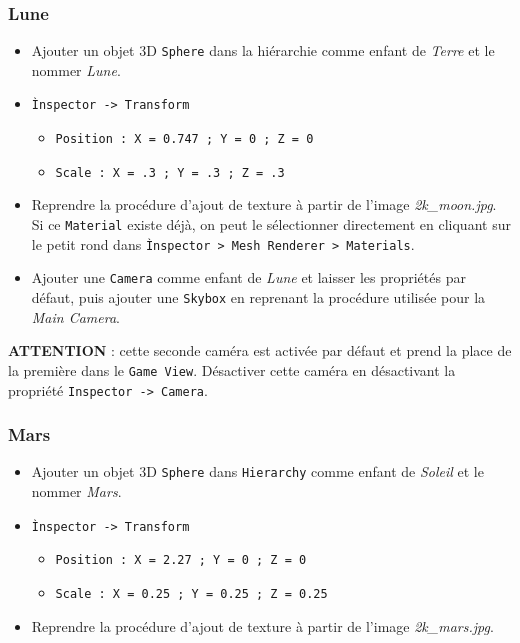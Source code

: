 \documentclass[a4paper,10pt]{article}
\newenvironment{solution}%
{\begin{tcolorbox}[breakable,colback=red!5!white,colframe=red!75!black,title=Solution]}%
{\end{tcolorbox}}
\begin{document}
\begin{solution}
\subsubsection{Lune}
\begin{itemize}
	\item Ajouter un objet 3D \texttt{Sphere} dans la hiérarchie comme enfant de \textit{Terre} et le nommer \textit{Lune}.
	\item \texttt{Ìnspector -> Transform}
	\begin{itemize}
		\item \texttt{Position : X = 0.747 ; Y = 0 ; Z = 0  }
		\item  \texttt{Scale : X = .3 ; Y = .3 ; Z = .3}
	\end{itemize}
	\item Reprendre la procédure d'ajout de texture à partir de l'image \textit{2k\_moon.jpg}. Si ce \texttt{Material} existe déjà, on peut le sélectionner directement en cliquant sur le petit rond dans \texttt{Ìnspector > Mesh Renderer > Materials}.
	\item Ajouter une \texttt{Camera} comme enfant de \textit{Lune} et laisser les propriétés par défaut, puis ajouter une \texttt{Skybox} en reprenant la procédure utilisée pour la \textit{Main Camera}.
\end{itemize}
	\textbf{ATTENTION} : cette seconde caméra est activée par défaut et prend la place de la première dans le \texttt{Game View}. Désactiver cette caméra en désactivant la propriété \texttt{Inspector -> Camera}.

\subsubsection{Mars}
\begin{itemize}
	\item  Ajouter un objet 3D \texttt{Sphere} dans \texttt{Hierarchy} comme enfant de \textit{Soleil} et le nommer \textit{Mars}.
	\item \texttt{Ìnspector -> Transform}
	\begin{itemize}
		\item \texttt{Position : X = 2.27 ; Y = 0 ; Z = 0 }
		\item \texttt{Scale : X = 0.25 ; Y = 0.25 ; Z = 0.25} 
	\end{itemize}
	
	\item Reprendre la procédure d'ajout de texture à partir de l'image \textit{2k\_mars.jpg}.
\end{itemize}


\end{solution}
\end{document}
